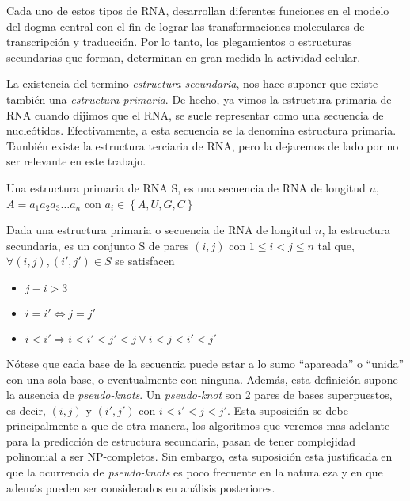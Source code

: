 Cada uno de estos tipos de \ac{RNA}, desarrollan diferentes funciones en el
modelo del dogma central con el fin de lograr las transformaciones moleculares
de transcripci\'on y traducci\'on. Por lo tanto, los plegamientos o estructuras
secundarias que forman, determinan en gran medida la actividad celular.

La existencia del termino \textit{estructura secundaria}, nos hace suponer que
existe tambi\'en una \textit{estructura primaria}. De hecho, ya vimos la
estructura primaria de \ac{RNA} cuando dijimos que el \ac{RNA}, se suele
representar como una secuencia de nucle\'otidos. Efectivamente, a esta secuencia
se la denomina estructura primaria. Tambi\'en existe la estructura terciaria de
\ac{RNA}, pero la dejaremos de lado por no ser relevante en este trabajo.

\begin{definition}
\label{rna_primary}
Una estructura primaria de \ac{RNA} S, es una secuencia de \ac{RNA} de longitud
$n$, $A=a_{1}a_{2}a_{3}\dots a_{n}$ con $a_{i} \in \left\lbrace A, U, G, C
\right\rbrace$ 
\end{definition}

\begin{definition}
\label{rna_secondary}
Dada una estructura primaria o secuencia de \ac{RNA} de longitud $n$, la
estructura secundaria, es un conjunto S de pares $(i,j)$ con $1\leq i < j \leq
n$ tal que, $\forall (i,j), (i',j') \in S$ se satisfacen
\begin{itemize}
 \item $j-i > 3$
 \item $i=i' \Leftrightarrow j=j'$
 \item $i< i'\Rightarrow i < i' < j' < j \lor i < j < i' < j'$ 
\end{itemize}
\end{definition}

N\'otese que cada base de la secuencia puede estar a lo sumo ``apareada'' o
``unida'' con una sola base, o eventualmente con ninguna. Adem\'as, esta
definici\'on supone la ausencia de \textit{pseudo-knots}. Un
\textit{pseudo-knot} son 2 pares de bases superpuestos, es decir, $(i,j)$ y
$(i',j')$ con $i < i' < j < j'$. Esta suposici\'on se debe principalmente a que
de otra manera, los algoritmos que veremos mas adelante para la predicci\'on de
estructura secundaria, pasan de tener complejidad polinomial a ser
NP-completos\cite{Lyngso00}. Sin embargo, esta suposici\'on esta justificada
en que la ocurrencia de \textit{pseudo-knots} es poco frecuente en la
naturaleza y en que adem\'as pueden ser considerados en an\'alisis
posteriores\cite{Zuker84}.


